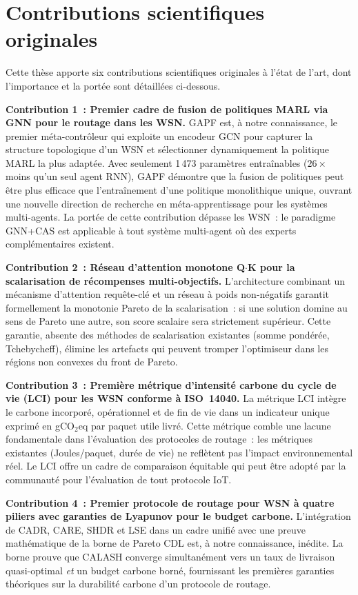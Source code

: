 \section{Contributions scientifiques originales}\label{sec:concl-contributions}

Cette thèse apporte six contributions scientifiques originales à l'état de l'art, dont l'importance et la portée sont détaillées ci-dessous.

\textbf{Contribution 1~: Premier cadre de fusion de politiques MARL via GNN pour le routage dans les WSN.}
GAPF est, à notre connaissance, le premier méta-contrôleur qui exploite un encodeur GCN pour capturer la structure topologique d'un WSN et sélectionner dynamiquement la politique MARL la plus adaptée. Avec seulement 1\,473 paramètres entraînables ($26\times$ moins qu'un seul agent RNN), GAPF démontre que la fusion de politiques peut être plus efficace que l'entraînement d'une politique monolithique unique, ouvrant une nouvelle direction de recherche en méta-apprentissage pour les systèmes multi-agents. La portée de cette contribution dépasse les WSN~: le paradigme GNN+CAS est applicable à tout système multi-agent où des experts complémentaires existent.

\textbf{Contribution 2~: Réseau d'attention monotone Q$\cdot$K pour la scalarisation de récompenses multi-objectifs.}
L'architecture combinant un mécanisme d'attention requête-clé et un réseau à poids non-négatifs garantit formellement la monotonie Pareto de la scalarisation~: si une solution domine au sens de Pareto une autre, son score scalaire sera strictement supérieur. Cette garantie, absente des méthodes de scalarisation existantes (somme pondérée, Tchebycheff), élimine les artefacts qui peuvent tromper l'optimiseur dans les régions non convexes du front de Pareto.

\textbf{Contribution 3~: Première métrique d'intensité carbone du cycle de vie (LCI) pour les WSN conforme à ISO~14040.}
La métrique LCI intègre le carbone incorporé, opérationnel et de fin de vie dans un indicateur unique exprimé en gCO$_2$eq par paquet utile livré. Cette métrique comble une lacune fondamentale dans l'évaluation des protocoles de routage~: les métriques existantes (Joules/paquet, durée de vie) ne reflètent pas l'impact environnemental réel. Le LCI offre un cadre de comparaison équitable qui peut être adopté par la communauté pour l'évaluation de tout protocole IoT.

\textbf{Contribution 4~: Premier protocole de routage pour WSN à quatre piliers avec garanties de Lyapunov pour le budget carbone.}
L'intégration de CADR, CARE, SHDR et LSE dans un cadre unifié avec une preuve mathématique de la borne de Pareto CDL est, à notre connaissance, inédite. La borne prouve que CALASH converge simultanément vers un taux de livraison quasi-optimal \emph{et} un budget carbone borné, fournissant les premières garanties théoriques sur la durabilité carbone d'un protocole de routage.

